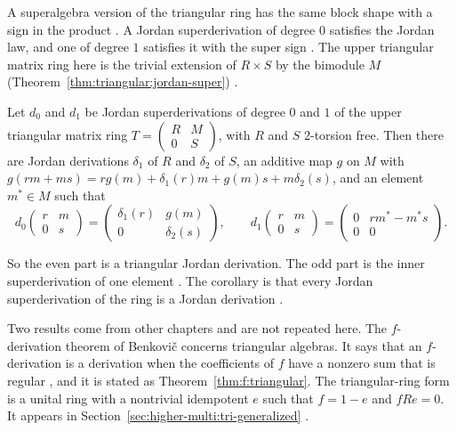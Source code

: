 A superalgebra version of the triangular ring has the same block shape with a
sign in the product \cite[p.~1]{CheraghpourJafari2024}. A Jordan superderivation
of degree $0$ satisfies the Jordan law, and one of degree $1$ satisfies it with
the super sign \cite[p.~2]{CheraghpourJafari2024}. The upper triangular matrix
ring here is the trivial extension of $R\times S$ by the bimodule $M$ (Theorem~\ref{thm:triangular:jordan-super})
\cite[p.~3]{CheraghpourJafari2024}.\begin{theorem}\label{thm:triangular:jordan-super}
Let $d_0$ and $d_1$ be Jordan superderivations of degree $0$ and $1$ of the
upper triangular matrix ring $T=\begin{pmatrix}R&M\\0&S\end{pmatrix}$, with $R$
and $S$ $2$-torsion free. Then there are Jordan derivations $\delta_1$ of $R$
and $\delta_2$ of $S$, an additive map $g$ on $M$ with
$g(rm+ms)=rg(m)+\delta_1(r)m+g(m)s+m\delta_2(s)$, and an element $m^{*}\in M$
such that
\[
d_0\begin{pmatrix}r&m\\0&s\end{pmatrix}
=\begin{pmatrix}\delta_1(r)&g(m)\\0&\delta_2(s)\end{pmatrix},
\qquad
d_1\begin{pmatrix}r&m\\0&s\end{pmatrix}
=\begin{pmatrix}0&rm^{*}-m^{*}s\\0&0\end{pmatrix}.
\]
\end{theorem}

So the even part is a triangular Jordan derivation. The odd part is the inner
superderivation of one element \cite[p.~6]{CheraghpourJafari2024}. The corollary
is that every Jordan superderivation of the ring is a Jordan derivation
\cite[p.~6]{CheraghpourJafari2024}.

Two results come from other chapters and are not repeated here. The
$f$-derivation theorem of Benkovič concerns triangular algebras. It says that an
$f$-derivation is a derivation when the coefficients of $f$ have a nonzero sum
that is regular \cite[Theorem~1.1]{Benkovic2014}, and it is stated as
Theorem~\ref{thm:f:triangular}. The triangular-ring form is a unital ring with a
nontrivial idempotent $e$ such that $f=1-e$ and $fRe=0$. It appears in
Section~\ref{sec:higher-multi:tri-generalized} \cite[p.~1953]{Wang2016Bideriv}.


